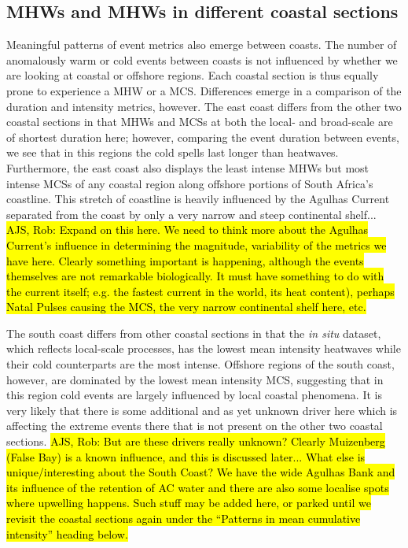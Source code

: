 \documentclass[a4paper,10pt,review]{elsarticle}
\begin{document}
\subsection{MHWs and MHWs in different coastal sections}
Meaningful patterns of event metrics also emerge between coasts. The number of anomalously warm or cold events between coasts is not influenced by whether we are looking at coastal or offshore regions. Each coastal section is thus equally prone to experience a MHW or a MCS. Differences emerge in a comparison of the duration and intensity metrics, however. The east coast differs from the other two coastal sections in that MHWs and MCSs at both the local- and broad-scale are of shortest duration here; however, comparing the event duration between events, we see that in this regions the cold spells last longer than heatwaves. Furthermore, the east coast also displays the least intense MHWs but most intense MCSs of any coastal region along offshore portions of South Africa's coastline. This stretch of coastline is heavily influenced by the Agulhas Current separated from the coast by only a very narrow and steep continental shelf... \hl{AJS, Rob: Expand on this here. We need to think more about the Agulhas Current's influence in determining the magnitude, variability of the metrics we have here. Clearly something important is happening, although the events themselves are not remarkable biologically. It must have something to do with the current itself; e.g. the fastest current in the world, its heat content), perhaps Natal Pulses causing the MCS, the very narrow continental shelf here, etc.}

The south coast differs from other coastal sections in that the \emph{in situ} dataset, which reflects local-scale processes, has the lowest mean intensity heatwaves while their cold counterparts are the most intense. Offshore regions of the south coast, however, are dominated by the lowest mean intensity MCS, suggesting that in this region cold events are largely influenced by local coastal phenomena. It is very likely that there is some additional and as yet unknown driver here which is affecting the extreme events there that is not present on the other two coastal sections. \hl{AJS, Rob: But are these drivers really unknown? Clearly Muizenberg (False Bay) is a known influence, and this is discussed later... What else is unique/interesting about the South Coast? We have the wide Agulhas Bank and its influence of the retention of AC water and there are also some localise spots where upwelling happens. Such stuff may be added here, or parked until we revisit the coastal sections again under the ``Patterns in mean cumulative intensity'' heading below.}
\end{document}
